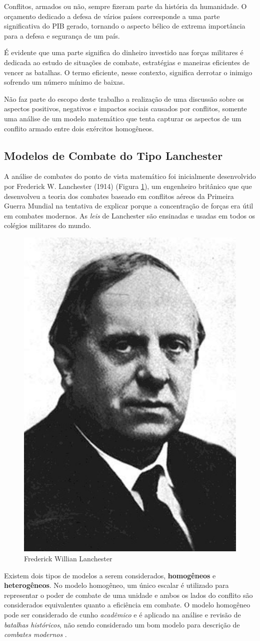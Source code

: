 \documentclass{article}
\begin{document}
Conflitos, armados ou não, sempre fizeram parte da história da humanidade. O orçamento dedicado a defesa de vários países corresponde a uma parte significativa do PIB gerado, tornando o aspecto bélico de extrema importância para a defesa e segurança de um país.

É evidente que uma parte significa do dinheiro investido nas forças militares é dedicada ao estudo de situações de combate, estratégias e maneiras eficientes de vencer as batalhas. O termo eficiente, nesse contexto, significa derrotar o inimigo sofrendo um número mínimo de baixas. 

Não faz parte do escopo deste trabalho a realização de uma discussão sobre os aspectos positivos, negativos e impactos sociais causados por conflitos, somente uma análise de um modelo  matemático que tenta capturar os aspectos de um conflito armado entre dois exércitos homogêneos.

\subsection{Modelos de Combate do Tipo Lanchester}

A análise de combates do ponto de vista matemático foi inicialmente desenvolvido por Frederick W. Lanchester (1914) (Figura \ref{fig:fw-lanchester}), um engenheiro britânico que que desenvolveu a teoria dos combates baseado em conflitos aéreos da Primeira Guerra Mundial na tentativa de explicar porque a concentração de forças era útil em combates modernos. As \textit{leis} de Lanchester são ensinadas e usadas em todos os colégios militares do mundo.

\begin{figure}[ht]
	\centering
	\includegraphics[width=0.3\linewidth]{figs/fw_lanchester_693x1024.jpg}
	\caption{Frederick Willian Lanchester}
	\label{fig:fw-lanchester}
\end{figure}

Existem dois tipos de modelos a serem considerados, \textbf{homogêneos} e \textbf{heterogêneos}. No modelo homogêneo, um único escalar é utilizado para representar o poder de combate de uma unidade e ambos os lados do conflito são considerados equivalentes quanto a eficiência em combate. O modelo homogêneo pode ser considerado de cunho \textit{acadêmico} e é aplicado na análise e revisão de \textit{batalhas históricos}, não sendo considerado um bom modelo para descrição de \textit{combates modernos} \cite{giordana03first}.
\end{document}
